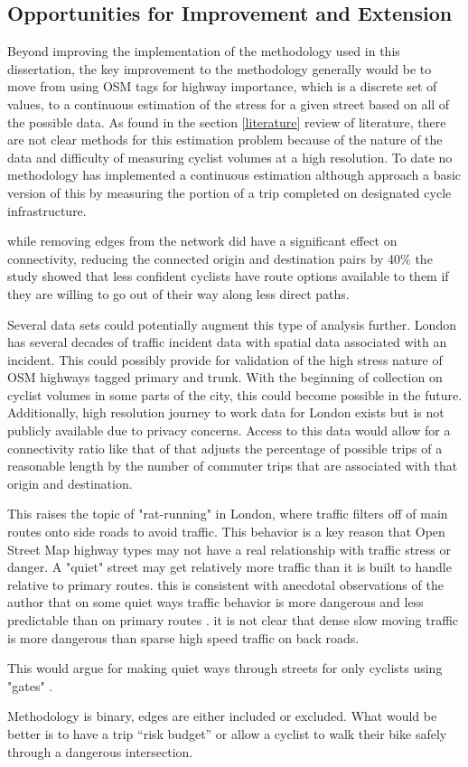 \subsection{Opportunities for Improvement and Extension}

Beyond improving the implementation of the methodology used in this dissertation, the key improvement to the methodology generally would be to move from using OSM tags for highway importance, which is a discrete set of values, to a continuous estimation of the stress for a given street based on all of the possible data. As found in the section \ref{literature} review of literature, there are not clear methods for this estimation problem because of the nature of the data and difficulty of measuring cyclist volumes at a high resolution. To date no methodology has implemented a continuous estimation although \textcite{boisjoly2019bicycle} approach a basic version of this by measuring the portion of a trip completed on designated cycle infrastructure. 

while removing edges from the network did have a significant effect on connectivity, reducing the connected origin and destination pairs by 40\% the study showed that less confident cyclists have route options available to them if they are willing to go out of their way along less direct paths.

Several data sets could potentially augment this type of analysis further. London has several decades of traffic incident data with spatial data associated with an incident. This could possibly provide for validation of the high stress nature of OSM highways tagged primary and trunk. With the beginning of collection on cyclist volumes in some parts of the city, this could become possible in the future.  Additionally, high resolution journey to work data for London exists but is not publicly available due to privacy concerns. Access to this data would allow for a connectivity ratio like that of \textcite{furth2016network} that adjusts the percentage of possible trips of a reasonable length by the number of commuter trips that are associated with that origin and destination. 


This raises the topic of "rat-running" in London, where traffic filters off of main routes onto side roads to avoid traffic. This behavior is a key reason that Open Street Map highway types may not have a real relationship with traffic stress or danger. A "quiet" street may get relatively more traffic than it is built to handle relative to primary routes. this is consistent with anecdotal observations of the author that on some quiet ways traffic behavior is more dangerous and less predictable than on primary routes . it is not clear that dense slow moving traffic is more dangerous than sparse high speed traffic on back roads. 

This would argue for making quiet ways through streets for only cyclists using "gates" .


Methodology is binary, edges are either included or excluded. What would be better is to have a trip ``risk budget''  or allow a cyclist to walk their bike safely through a dangerous intersection. 
